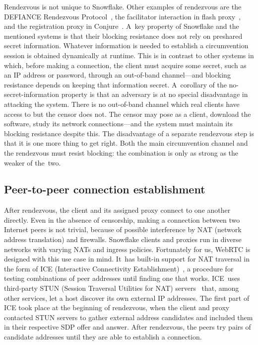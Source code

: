 \documentclass[letterpaper,twocolumn]{article}
\begin{document}
Rendezvous is not unique to Snowflake.
Other examples of rendezvous are
the DEFIANCE Rendezvous Protocol~\cite[\S 3]{Lincoln2012a},
the facilitator interaction in flash proxy~\cite[\S 3]{Fifield2012a},
and the registration proxy in Conjure~\cite[\S 4.1]{Frolov2019b}.
A~key property of Snowflake and the mentioned systems
is that their blocking resistance does not rely on preshared secret information.
Whatever information is needed to establish a circumvention session
is obtained dynamically at runtime.
This is in contrast to other systems in which,
before making a connection,
the client must acquire some secret,
such as an IP address or password,
through an out-of-band channel---and
blocking resistance depends on
keeping that information secret.
A~corollary of the no-secret-information property
is that an adversary is
at no special disadvantage in attacking the system.
There is no out-of-band channel which real clients have access to
but the censor does not.
The censor may pose as a client,
download the software,
study its network connections---and
the system must maintain its blocking resistance despite this.
The disadvantage of a separate rendezvous step
is that it is one more thing to get right.
Both the main circumvention channel
and the rendezvous must resist blocking:
the combination is only as strong as the weaker of the~two.

\subsection{Peer-to-peer connection establishment}
\label{sec:connection}

After rendezvous,
the client and its assigned proxy connect to one another directly.
Even in the absence of censorship,
making a connection between two Internet peers is not trivial,
because of possible interference by NAT (network address translation) and firewalls.
Snowflake clients and proxies run in diverse networks
with varying NATs and ingress policies.
Fortunately for us,
WebRTC is designed with this use case in mind.
It~has built-in support for NAT traversal in the form of
ICE (Interactive Connectivity Establishment)~\cite{rfc8445},
a procedure for testing combinations of peer addresses
until finding one that works.
ICE~uses third-party
STUN (Session Traversal Utilities for NAT) servers~\cite{rfc8489}
that, among other services,
let a host discover its own external IP addresses.
The first part of ICE took place at the beginning of rendezvous,
when the client and proxy contacted STUN servers to gather
external address candidates and included them in their respective
SDP offer and answer.
After rendezvous,
the peers try pairs of candidate addresses
until they are able to establish a connection.
\end{document}
